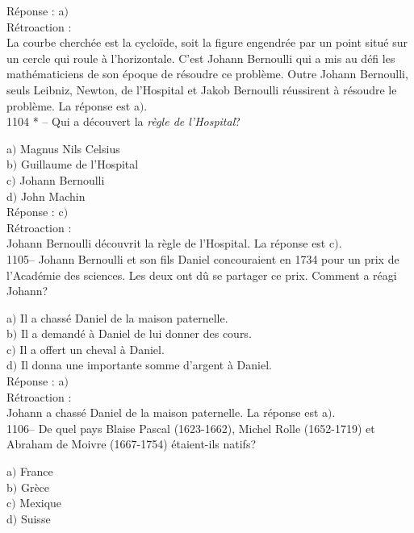 ﻿\documentclass[letterpaper, 12pt]{article}
\begin{document}
R\'eponse : a$)$\\

R\'etroaction : \\
La courbe cherch\'ee est la cyclo\"ide, soit la figure engendr\'ee
par un point situ\'e sur un cercle qui roule \`a l'horizontale.
C'est Johann Bernoulli qui a mis au d\'efi les math\'ematiciens de
son \'epoque de r\'esoudre ce probl\`eme. Outre Johann Bernoulli,
seuls Leibniz, Newton, de l'Hospital et Jakob Bernoulli r\'eussirent
\`a r\'esoudre le probl\`eme.
La r\'eponse est a$)$.\\

1104 * -- Qui a d\'ecouvert la {\sl r\`egle de l'Hospital}?

a$)$ Magnus Nils Celsius \\
b$)$ Guillaume de l'Hospital \\
c$)$ Johann Bernoulli  \\
d$)$ John Machin  \\

R\'eponse : c$)$\\

R\'etroaction : \\
Johann Bernoulli d\'ecouvrit la r\`egle de l'Hospital.
La r\'eponse est c$)$.\\

1105-- Johann Bernoulli et son fils Daniel concouraient en 1734 pour
un prix de l'Acad\'emie des sciences. Les deux ont d\^u se partager
ce prix. Comment a r\'eagi Johann?

a$)$ Il a chass\'e Daniel de la maison paternelle.  \\
b$)$ Il a demand\'e \`a Daniel de lui donner des cours. \\
c$)$ Il a offert un cheval \`a Daniel.  \\
d$)$ Il donna une importante somme d'argent \`a Daniel.  \\

R\'eponse : a$)$\\

R\'etroaction : \\
Johann a chass\'e Daniel de la maison paternelle.
La r\'eponse est a$)$.\\

1106-- De quel pays Blaise Pascal (1623-1662), Michel Rolle
(1652-1719) et Abraham de Moivre (1667-1754) \'etaient-ils natifs?

a$)$ France  \\
b$)$ Gr\`ece \\
c$)$ Mexique  \\
d$)$ Suisse \\
\end{document}

